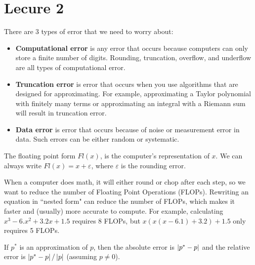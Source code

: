 \documentclass{article}
\begin{document}
\section{Lecure 2}
There are 3 types of error that we need to worry about:
\begin{itemize}
    \item \textbf{Computational error} is any error that occurs because computers can only store a finite number of digits. Rounding, truncation, overflow, and underflow are all types of computational error.
    \item \textbf{Truncation error} is error that occurs when you use algorithms that are designed for approximating. For example, approximating a Taylor polynomial with finitely many terms or approximating an integral with a Riemann sum will result in truncation error.
    \item \textbf{Data error} is error that occurs because of noise or measurement error in data. Such errors can be either random or systematic.
\end{itemize}
The floating point form $Fl(x)$, is the computer's representation of $x$. We can always write $Fl(x) = x + \varepsilon$, where $\varepsilon$ is the rounding error.
\par
When a computer does math, it will either round or chop after each step, so we want to reduce the number of Floating Point Operations (FLOPs). Rewriting an equation in ``nested form" can reduce the number of FLOPs, which makes it faster and (usually) more accurate to compute. For example, calculating $x^3-6.x^2+3.2x+1.5$ requires 8 FLOPs, but $x(x(x-6.1)+3.2)+1.5$ only requires 5 FLOPs.
\par
If $p^*$ is an approximation of $p$, then the absolute error is $\left\lvert p^*-p \right\rvert$ and the relative error is $\left\lvert p^*-p \right\rvert/\left\lvert p \right\rvert$ (assuming $p \neq 0$).
\end{document}
